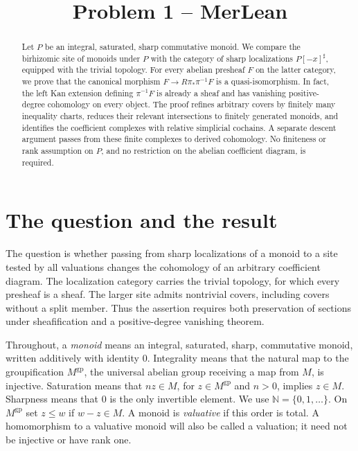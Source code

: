 \documentclass[11pt]{article}
\title{Problem 1 -- MerLean}
\author{}
\date{}
\theoremstyle{definition}
\theoremstyle{remark}
\newcommand{\N}{\mathbb N}
\newcommand{\gp}{\mathrm{gp}}
\begin{document}
\maketitle

\begin{abstract}
Let $P$ be an integral, saturated, sharp commutative monoid. We compare the birhizomic site of monoids under $P$ with the category of sharp localizations $P[-x]^\sharp$, equipped with the trivial topology. For every abelian presheaf $F$ on the latter category, we prove that the canonical morphism $F\to R\pi_*\pi^{-1}F$ is a quasi-isomorphism. In fact, the left Kan extension defining $\pi^{-1}F$ is already a sheaf and has vanishing positive-degree cohomology on every object. The proof refines arbitrary covers by finitely many inequality charts, reduces their relevant intersections to finitely generated monoids, and identifies the coefficient complexes with relative simplicial cochains. A separate descent argument passes from these finite complexes to derived cohomology. No finiteness or rank assumption on $P$, and no restriction on the abelian coefficient diagram, is required.
\end{abstract}

\section{The question and the result}

The question is whether passing from sharp localizations of a monoid to a site tested by all valuations changes the cohomology of an arbitrary coefficient diagram. The localization category carries the trivial topology, for which every presheaf is a sheaf. The larger site admits nontrivial covers, including covers without a split member. Thus the assertion requires both preservation of sections under sheafification and a positive-degree vanishing theorem.

Throughout, a \emph{monoid} means an integral, saturated, sharp, commutative monoid, written additively with identity $0$. Integrality means that the natural map to the groupification $M^{\gp}$, the universal abelian group receiving a map from $M$, is injective. Saturation means that $nz\in M$, for $z\in M^{\gp}$ and $n>0$, implies $z\in M$. Sharpness means that $0$ is the only invertible element. We use $\N=\{0,1,\ldots\}$. On $M^{\gp}$ set $z\leq w$ if $w-z\in M$. A monoid is \emph{valuative} if this order is total. A homomorphism to a valuative monoid will also be called a valuation; it need not be injective or have rank one.
\end{document}
